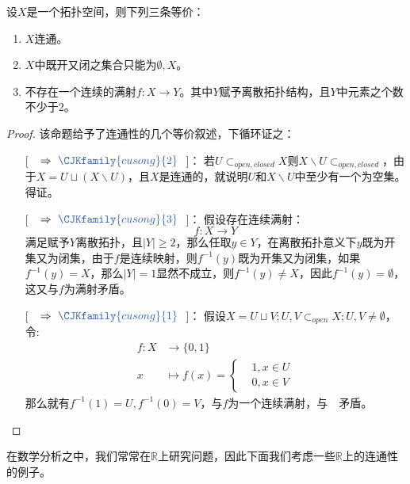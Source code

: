 \documentclass[lang=cn,10pt,device=pad]{elegantbook}
\newcommand{\cusong}{\CJKfamily{cusong}}%
\newcommand{\lei}[1]{~\textcolor{myblu}{\cusong{#1}}~}
\newcommand{\dkh}[1]{\{#1\}}
\newcommand{\chadiao}{\backslash}
\begin{document}
\begin{proposition}
	
	设$X$是一个拓扑空间，则下列三条等价：
	\begin{enumerate}
	\item $X$连通。
	\item $X$中既开又闭之集合只能为$\emptyset, X$。
	\item 不存在一个连续的满射$f:X\longrightarrow Y$。其中$Y$赋予离散拓扑结构，且$Y$中元素之个数不少于2。	
	\end{enumerate}
	\end{proposition}
	\begin{proof}
		该命题给予了连通性的几个等价叙述，下循环证之：
		\begin{enumerate}
			\item[[\lei{1}$\Rightarrow\lei{2}$]]： 若$U\subset_{open,closed}X$则$X\chadiao U\subset_{open,closed}$，由于$X = U\sqcup (X\chadiao U)$，且$X$是连通的，就说明$U$和$X\chadiao U$中至少有一个为空集。得证。
			\item[[\lei{2}$\Rightarrow\lei{3}$]]： 假设存在连续满射：
			\begin{equation*}
				f:X\longrightarrow Y
			\end{equation*}
			满足赋予$Y$离散拓扑，且$|Y| \geq 2$，那么任取$y\in Y$，在离散拓扑意义下$y$既为开集又为闭集，由于$f$是连续映射，则$f^{-1}(y)$既为开集又为闭集，如果$f^{-1}(y)=X$，那么$|Y| = 1$显然不成立，则$f^{-1}(y)\neq X$，因此$f^{-1}(y)=\emptyset$，这又与$f$为满射矛盾。
			\item[[\lei{3}$\Rightarrow\lei{1}$]]： 假设$X = U\sqcup V;U,V\subset_{open}X ;U,V\neq \emptyset$，令:
			\begin{equation*}
				\begin{aligned}
					f:X&\longrightarrow\dkh{0,1}\\
					x&\longmapsto f(x) = \left\{ \begin{aligned}
					&1,x\in U\\
					&0,x\in V
					\end{aligned} \right.
				\end{aligned}
			\end{equation*}
			那么就有$f^{-1}(1) = U,f^{-1}(0) = V$，与$f$为一个连续满射，与\lei{3}矛盾。
		\end{enumerate}
	\end{proof}





在数学分析之中，我们常常在$\mathbb{R}$上研究问题，因此下面我们考虑一些$\mathbb{R}$上的连通性的例子。
\end{document}
